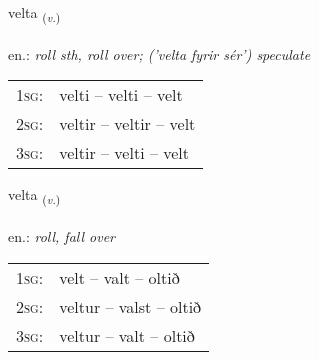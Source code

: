 \documentclass[frontgrid, backgrid]{flacards}\usepackage[]{graphicx}\usepackage[]{xcolor}
\begin{document}
\renewcommand{\flhead}{\vskip5pt \fboxsep=0pt {\small\bfseries\footnotesize Sagnorð | Verb}}
\renewcommand{\fcfoot}{\vskip5pt \fboxsep=0pt \hspace{2pt}{\small\bfseries\footnotesize 1K}}

\renewcommand{\blhead}{\vskip5pt {\small\bfseries\footnotesize Sagnorð | Verb }}
\renewcommand{\bcfoot}{\vskip5pt \hspace{2pt}{\small\bfseries\footnotesize 1K}}


{velta \small{\textsubscript{(\textit{v.})}} \\[1ex] %
\textphonetic{[vɛl̥ta]} \\
en.: \emph{roll sth, roll over; ('velta fyrir sér') speculate} \\  [2ex]
\renewcommand*{\arraystretch}{0.8}
\begin{tabular}{p{1cm}l}
\textsc{1sg}: & velti -- velti -- velt \\ 
\textsc{2sg}: & veltir -- veltir -- velt \\ 
\textsc{3sg}: & veltir -- velti -- velt \\ 
\end{tabular}
}

\renewcommand{\flhead}{\vskip5pt \fboxsep=0pt {\small\bfseries\footnotesize Sagnorð | Verb}}
\renewcommand{\fcfoot}{\vskip5pt \fboxsep=0pt \hspace{2pt}{\small\bfseries\footnotesize 1K}}

\renewcommand{\blhead}{\vskip5pt {\small\bfseries\footnotesize Sagnorð | Verb }}
\renewcommand{\bcfoot}{\vskip5pt \hspace{2pt}{\small\bfseries\footnotesize 1K}}


{velta \small{\textsubscript{(\textit{v.})}} \\[1ex] %
\textphonetic{[vɛl̥ta]} \\
en.: \emph{roll, fall over} \\  [2ex]
\renewcommand*{\arraystretch}{0.8}
\begin{tabular}{p{1cm}l}
\textsc{1sg}: & velt -- valt -- oltið \\ 
\textsc{2sg}: & veltur -- valst -- oltið \\ 
\textsc{3sg}: & veltur -- valt -- oltið \\ 
\end{tabular}
}
\end{document}

